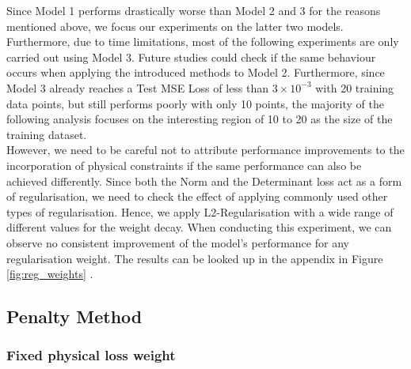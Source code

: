 \indent Since Model 1 performs drastically worse than Model 2 and 3 for the reasons mentioned above, we focus our experiments on the latter two models. Furthermore, due to time limitations, most of the following experiments are only carried out using Model 3. Future studies could check if the same behaviour occurs when applying the introduced methods to Model 2. Furthermore, since Model 3 already reaches a Test MSE Loss of less than $3\times10^{-3}$ with 20 training data points, but still performs poorly with only 10 points, the majority of the following analysis focuses on the interesting region of 10 to 20 as the size of the training dataset. \\
\indent However, we need to be careful not to attribute performance improvements to the incorporation of physical constraints if the same performance can also be achieved differently. Since both the Norm and the Determinant loss act as a form of regularisation, we need to check the effect of applying commonly used other types of regularisation. Hence, we apply L2-Regularisation with a wide range of different values for the weight decay. When conducting this experiment, we can observe no consistent improvement of the model's performance for any regularisation weight. The results can be looked up in the appendix in Figure \ref{fig:reg_weights} .

\subsection{Penalty Method}
\subsubsection{Fixed physical loss weight}

